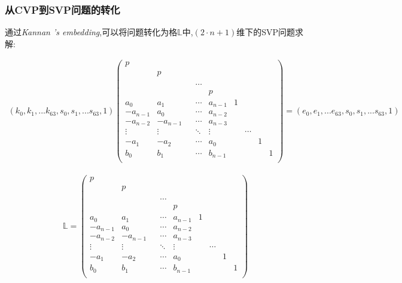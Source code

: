 \documentclass[12pt,a4paper]{article}
\newcommand{\supercite}[2][]{\textsuperscript{\citep[#1]{#2}}}
\numberwithin{equation}{section}
\begin{document}
\subsubsection{从CVP到SVP问题的转化}
通过\textit{Kannan 's embedding}\supercite[]{kannan1987},可以将问题转化为格$\mathbb{L}$中,$(2 \cdot n+1) $维下的SVP问题求解:

\begin{align}
	(k_0,k_1,...k_{63},s_0,s_1,...s_{63},1)
	\left(
	\begin{smallmatrix}
			p\\
			&p\\
			&&\\
			&&&\cdots\\
			&&&&p\\
			a_0    &a_1    &   &\cdots &a_{n-1}            &1\\
			-a_{n-1}&a_0    &   &\cdots &a_{n-2}       &&\\
			-a_{n-2}&-a_{n-1}&   &\cdots &a_{n-3}  &&\\
			\vdots &\vdots &&\ddots &\vdots             &&\cdots\\
			-a_1    &-a_2    &   &\cdots &a_0 &&&1\\
			b_0    &b_1    &   &\cdots &b_{n-1}&&&&1\\
		\end{smallmatrix}
	\right)
	=
	(e_0,e_1,...e_{63},s_0,s_1,...s_{63},1)
\end{align}

\begin{align}
    \mathbb{L}=
	\left(
	\begin{smallmatrix}
			p\\
			&p\\
			&&\\
			&&&\cdots\\
			&&&&p\\
			a_0    &a_1    &   &\cdots &a_{n-1}            &1\\
			-a_{n-1}&a_0    &   &\cdots &a_{n-2}       &&\\
			-a_{n-2}&-a_{n-1}&   &\cdots &a_{n-3}  &&\\
			\vdots &\vdots &&\ddots &\vdots             &&\cdots\\
			-a_1    &-a_2    &   &\cdots &a_0 &&&1\\
			b_0    &b_1    &   &\cdots &b_{n-1}&&&&1\\
		\end{smallmatrix}
	\right)
\end{align}
\end{document}
